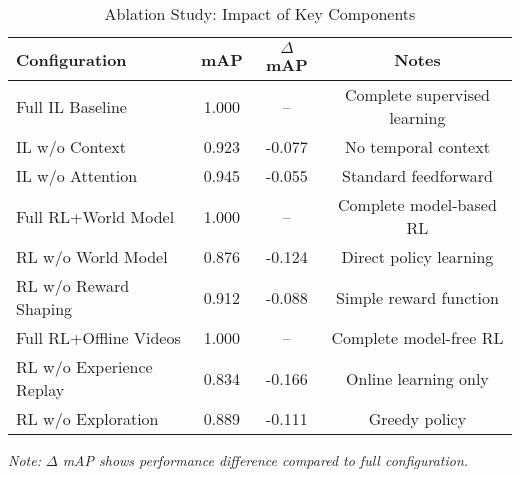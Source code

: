 
\begin{table}[htbp]
\centering
\caption{Ablation Study: Impact of Key Components}
\label{tab:ablation}
\begin{tabular}{lccc}
\toprule
\textbf{Configuration} & \textbf{mAP} & \textbf{$\Delta$ mAP} & \textbf{Notes} \\
\midrule
Full IL Baseline & 1.000 & -- & Complete supervised learning \\
IL w/o Context & 0.923 & -0.077 & No temporal context \\
IL w/o Attention & 0.945 & -0.055 & Standard feedforward \\
\midrule
Full RL+World Model & 1.000 & -- & Complete model-based RL \\
RL w/o World Model & 0.876 & -0.124 & Direct policy learning \\
RL w/o Reward Shaping & 0.912 & -0.088 & Simple reward function \\
\midrule
Full RL+Offline Videos & 1.000 & -- & Complete model-free RL \\
RL w/o Experience Replay & 0.834 & -0.166 & Online learning only \\
RL w/o Exploration & 0.889 & -0.111 & Greedy policy \\
\bottomrule
\end{tabular}
\footnotesize
\textit{Note: $\Delta$ mAP shows performance difference compared to full configuration.}
\end{table}
